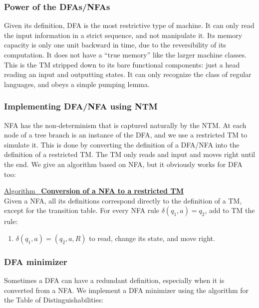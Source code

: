 \documentclass[12pt]{article}  %
\newcommand{\algtitle}[1]{\underline{Algorithm \ {\bf #1}} \vspace*{1mm}\\}
\begin{document}
\subsubsection{Power of the DFAs/NFAs}

Given its definition, DFA is the most restrictive type of machine. It can only read the input information in a strict sequence, and not manipulate it. Its memory capacity is only one unit backward in time, due to the reversibility of its computation. It does not have a ``true memory'' like the larger machine classes. This is the TM stripped down to its bare functional components: just a head reading an input and outputting states. It can only recognize the class of regular languages, and obeys a simple pumping lemma.


\subsubsection{Implementing DFA/NFA using NTM}
NFA has the non-determinism that is captured naturally by the NTM. At each node of a tree branch is an instance of the DFA, and we use a restricted TM to simulate it. This is done by converting the definition of a DFA/NFA into the definition of a restricted TM. The TM only reads and input and moves right until the end. We give an algorithm based on NFA, but it obviously works for DFA too:

\algtitle{Conversion of a NFA to a restricted TM}
Given a NFA, all its definitions correspond directly to the definition of a TM, except for the transition table. For every NFA rule $\delta(q_1, a) = q_2$, add to TM the rule:
\begin{enumerate}
	\item $\delta(q_1, a) = (q_2, a, R)$ to read, change its state, and move right.
\end{enumerate}



\subsubsection{DFA minimizer}
Sometimes a DFA can have a redundant definition, especially when it is converted from a NFA. We implement a DFA minimizer using the algorithm for the Table of Distinguishabilities:
\end{document}
